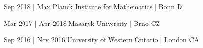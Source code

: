 \begin{eyenumerate}
   \item {}
   {Sep 2018 |         }
   {Max Planck Institute for Mathematics | Bonn D}
   \item {}
   {Mar 2017 | Apr 2018}
   {Masaryk University | Brno CZ}
   \item {}
   {Sep 2016 | Nov 2016}
   {University of Western Ontario | London CA}
\end{eyenumerate}
